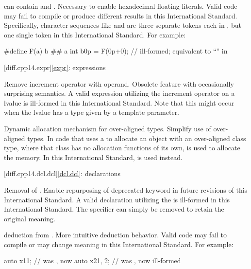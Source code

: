\change {} can contain   and
 .
\rationale Necessary to enable hexadecimal floating literals.
\effect
Valid \CppXIV{} code may fail to compile or produce different results in
this International Standard. Specifically, character sequences like 
and  are three separate tokens each in \CppXIV{}, but one single token
in this International Standard.
For example:

\begin{codeblock}
#define F(a) b ## a
int b0p = F(0p+0);  // ill-formed; equivalent to ``\!'' in \CppXIV{}
\end{codeblock}

[diff.cpp14.expr]{\ref{expr}: expressions}

\change
Remove increment operator with  operand.
\rationale Obsolete feature with occasionally surprising semantics.
\effect A valid \CppXIV{} expression utilizing the increment operator on
a  lvalue is ill-formed in this International Standard.
Note that this might occur when the lvalue has a type given by a template
parameter.

\change Dynamic allocation mechanism for over-aligned types.
\rationale Simplify use of over-aligned types.
\effect In \CppXIV{} code that uses a 
to allocate an object with an over-aligned class type,
where that class has no allocation functions of its own,
is used to allocate the memory.
In this International Standard,
is used instead.

[diff.cpp14.dcl.dcl]{\ref{dcl.dcl}: declarations}

%
\change Removal of  .
\rationale Enable repurposing of deprecated keyword in future revisions of this International Standard.
\effect
A valid \CppXIV{} declaration utilizing the 
 is ill-formed in this International Standard.
The specifier can simply be removed to retain the original meaning.

\change {} deduction from .
\rationale More intuitive deduction behavior.
\effect
Valid \CppXIV{} code may fail to compile or may change meaning
in this International Standard. For example:
\begin{codeblock}
auto x1{1};    // was , now 
auto x2{1, 2}; // was , now ill-formed
\end{codeblock}

